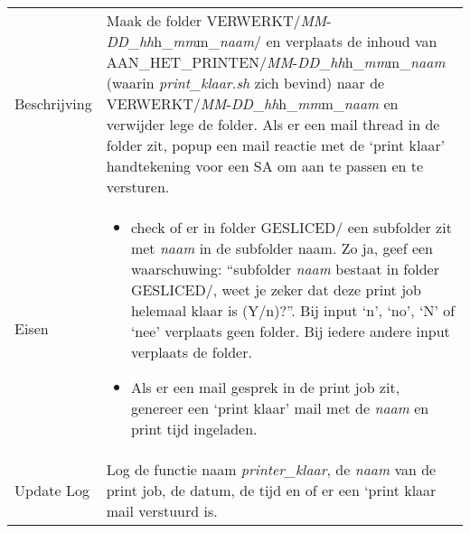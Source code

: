 \documentclass{article}
\newcommand{\quotes}[1]{``#1''}
\begin{document}
\begin{table}[H]
    \centering
    \begin{tabular}%
    {>{\raggedright\arraybackslash}p{}%
    |>{\raggedright\arraybackslash}p{}}
    \rowcolor{myblue} \multicolumn{2}{c}{\rule{0pt}{13pt}Functie: {\Large printer\_klaar.sh}} \\\hline
    Beschrijving & Maak de folder VERWERKT/\textit{MM}-\textit{DD}\_\textit{hh}h\_\textit{mm}m\_\textit{naam}/ en verplaats de inhoud van AAN\_HET\_PRINTEN/\textit{MM}-\textit{DD}\_\textit{hh}h\_\textit{mm}m\_\textit{naam} (waarin \textit{print\_klaar.sh} zich bevind) naar de VERWERKT/\textit{MM}-\textit{DD}\_\textit{hh}h\_\textit{mm}m\_\textit{naam} en verwijder lege de folder. Als er een mail thread in de folder zit, popup een mail reactie met de `print klaar' handtekening voor een SA om aan te passen en te versturen.\\ Eisen & 
    \begin{itemize} 
      \item check of er in folder GESLICED/ een subfolder zit met \textit{naam} in de subfolder naam. Zo ja, geef een waarschuwing: \quotes{subfolder \textit{naam} bestaat in folder GESLICED/, weet je zeker dat deze print job helemaal klaar is (Y/n)?}. Bij input `n', `no', `N' of `nee' verplaats geen folder. Bij iedere andere input verplaats de folder.
\item Als er een mail gesprek in de print job zit, genereer een `print klaar' mail met de \textit{naam} en print tijd ingeladen.
\end{itemize} \\
  Update Log& Log de functie naam \textit{printer\_klaar}, de \textit{naam} van de print job, de datum, de tijd en of er een `print klaar
   mail verstuurd is.\\
    \end{tabular}
\end{table}
\end{document}
